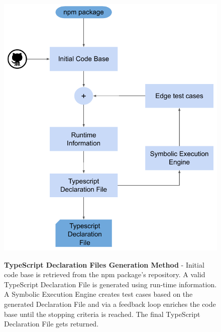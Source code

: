 \begin{figure}[t]
\begin{centering}
    {\includegraphics[scale=0.9]{figures/approach/typescript_declaration_files_generation_method_block_diagram.pdf}}
    \caption[TypeScript Declaration Files Generation Method]{\textbf{TypeScript Declaration Files Generation Method} - Initial code base is retrieved from the npm package's repository. A valid TypeScript Declaration File is generated using run-time information. A Symbolic Execution Engine creates test cases based on the generated Declaration File and via a feedback loop enriches the code base until the stopping criteria is reached. The final TypeScript Declaration File gets returned.}
    \label{fig:tsd_generation_method_block_diagram}
\end{centering}
\end{figure}
